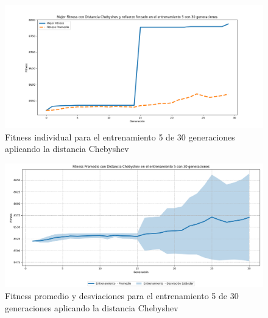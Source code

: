\documentclass[lettersize, journal]{IEEEtran}
\begin{document}

\begin{figure}[H]
    \centering
    \includegraphics[width=0.9 \linewidth]{Chebyshev/Fitness_individual_30Gen/Fitness_5_Cheby_30Gen.png}
    \caption{Fitness individual para el entrenamiento 5 de 30 generaciones aplicando la distancia Chebyshev}
    \label{fig:cheb_5_30}
\end{figure}
\begin{figure}[H]
    \centering
    \includegraphics[width=0.9 \linewidth]{Chebyshev/Fitness_individual_30Gen/Fitness_5_Cheby_30Gen_Sombra.png}
    \caption{Fitness promedio y desviaciones para el entrenamiento 5 de 30 generaciones aplicando la distancia Chebyshev}
    \label{fig:cheb_5_30_sombra}
\end{figure}
\end{document}
